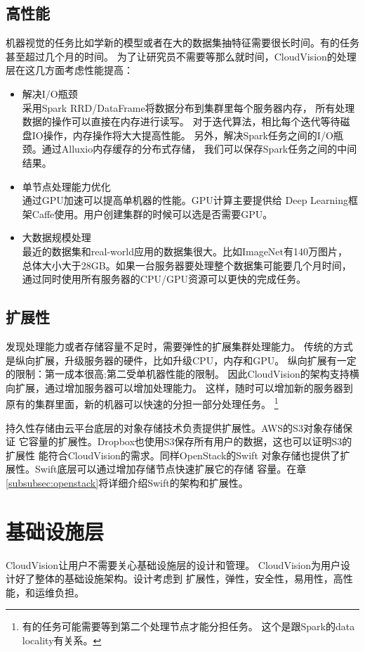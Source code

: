\subsection{高性能}
机器视觉的任务比如学新的模型或者在大的数据集抽特征需要很长时间。有的任务甚至超过几个月的时间。
为了让研究员不需要等那么就时间，CloudVision的处理层在这几方面考虑性能提高：
\begin{itemize}
  \item 解决I/O瓶颈 \\
        采用Spark RRD/DataFrame将数据分布到集群里每个服务器内存，
        所有处理数据的操作可以直接在内存进行读写。
        对于迭代算法，相比每个迭代等待磁盘IO操作，内存操作将大大提高性能。
        另外，解决Spark任务之间的I/O瓶颈。通过Alluxio内存缓存的分布式存储，
        我们可以保存Spark任务之间的中间结果。
  \item 单节点处理能力优化 \\
        通过GPU加速可以提高单机器的性能。GPU计算主要提供给
        Deep Learning框架Caffe使用。用户创建集群的时候可以选是否需要GPU。
  \item 大数据规模处理 \\
        最近的数据集和real-world应用的数据集很大。比如ImageNet有140万图片，
        总体大小大于28GB。如果一台服务器要处理整个数据集可能要几个月时间，
        通过同时使用所有服务器的CPU/GPU资源可以更快的完成任务。
\end{itemize}

\subsection{扩展性}
发现处理能力或者存储容量不足时，需要弹性的扩展集群处理能力。
传统的方式是纵向扩展，升级服务器的硬件，比如升级CPU，内存和GPU。
纵向扩展有一定的限制：第一成本很高;第二受单机器性能的限制。
因此CloudVision的架构支持横向扩展，通过增加服务器可以增加处理能力。
这样，随时可以增加新的服务器到原有的集群里面，新的机器可以快速的分担一部分处理任务。
\footnote{有的任务可能需要等到第二个处理节点才能分担任务。
这个是跟Spark的data locality有关系。}

持久性存储由云平台底层的对象存储技术负责提供扩展性。AWS的S3对象存储保证
它容量的扩展性。Dropbox也使用S3保存所有用户的数据，这也可以证明S3的扩展性
能符合CloudVision的需求。同样OpenStack的Swift
对象存储也提供了扩展性。Swift底层可以通过增加存储节点快速扩展它的存储
容量。在章\ref{subsubsec:openstack}将详细介绍Swift的架构和扩展性。

\section{基础设施层}
\label{sec:arch_infra}
CloudVision让用户不需要关心基础设施层的设计和管理。
CloudVision为用户设计好了整体的基础设施架构。设计考虑到
扩展性，弹性，安全性，易用性，高性能，和运维负担。


